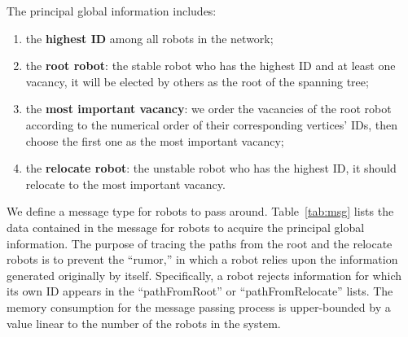 The principal global information includes: 
\begin{enumerate}
\item the \textbf{highest ID} among all robots in the network;
\item the \textbf{root robot}: the stable robot who has the highest ID and at least one vacancy, it will be elected by others as the root of the spanning tree;
\item the \textbf{most important vacancy}: we order the vacancies of the root robot according to the numerical order of their corresponding vertices' IDs, then choose the first one as the most important vacancy;
\item the \textbf{relocate robot}: the unstable robot who has the highest ID, it should relocate to the most important vacancy.
\end{enumerate}


We define a message type for robots to pass around.
%
Table~\ref{tab:msg} lists the data contained in the message for robots to acquire the principal global information. 
%
The purpose of tracing the paths from the root and the relocate robots is
to prevent the ``rumor,'' in which a robot relies upon the
information generated originally by itself.  
%
Specifically, a robot
rejects information for which its own ID appears in the
``pathFromRoot'' or ``pathFromRelocate'' lists.
%
The memory consumption for the message passing process is upper-bounded by a value linear to the number of the robots in the system. 

